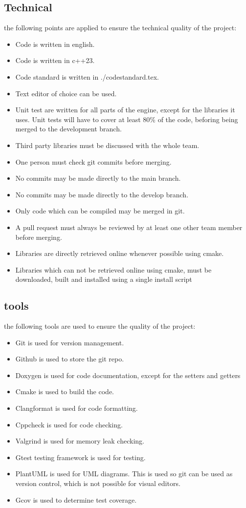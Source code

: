 \documentclass{article} %
\begin{document}
\subsection{Technical}
the following points are applied to ensure the technical quality of the project:
\begin{itemize}
    \item Code is written in english.
    \item Code is written in c++23.
    \item Code standard is written in ./codestandard.tex.
    \item Text editor of choice can be used.
    \item Unit test are written for all parts of the engine, except for the libraries it uses. Unit tests will have to cover at least 80\% of the code, beforing being merged to the development branch.
    \item Third party libraries must be discussed with the whole team.
    \item One person must check git commits before merging.
    \item No commits may be made directly to the main branch.
    \item No commits may be made directly to the develop branch.
    \item Only code which can be compiled may be merged in git.
    \item A pull request must always be reviewed by at least one other team member before merging.
    \item Libraries are directly retrieved online whenever possible using cmake.
    \item Libraries which can not be retrieved online using cmake, must be downloaded, built and installed using a single install script
\end{itemize}

\subsection{tools}
the following tools are used to ensure the quality of the project:
\begin{itemize}
    \item Git is used for version management.
    \item Github is used to store the git repo.
    \item Doxygen is used for code documentation, except for the setters and getters
    \item Cmake is used to build the code.
    \item Clangformat is used for code formatting.
    \item Cppcheck is used for code checking.
    \item Valgrind is used for memory leak checking.
    \item Gtest testing framework is used for testing.
    \item PlantUML is used for UML diagrams. This is used so git can be used as version control, which is not possible for visual editors.
    \item Gcov is used to determine test coverage.
\end{itemize}
\newpage
\end{document}
